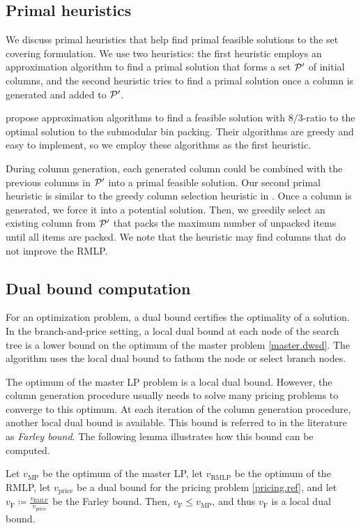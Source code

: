 \subsection{Primal heuristics}
\label{sec.pheur}
We discuss primal heuristics that help find primal feasible solutions to the set covering formulation. We use two heuristics: the first heuristic employs an approximation algorithm to find a primal solution that forms a set $\mathcal P'$ of initial columns, and the second heuristic tries to find a primal solution once a column is generated and added to $\mathcal P'$.

 \cite{cohen2019overcommitment} propose approximation algorithms to find a feasible solution with $8/3$-ratio to the optimal solution to the submodular bin packing. Their algorithms are greedy and easy to implement, so we employ these algorithms as the first heuristic.


During column generation, each generated column could be combined with the previous columns in $\mathcal P'$ into a  primal feasible solution. Our second primal  heuristic is similar to the greedy column selection heuristic in \cite{lubbecke2012primal,joncour2010column}.  Once a column is generated, we force it into a potential solution. Then, we greedily select an existing column from $\mathcal P'$ that packs the maximum number of unpacked items until all items are packed.  We note that the heuristic may find columns that do not improve the RMLP.




\subsection{Dual bound computation}

For an optimization problem, a dual bound certifies the optimality of a solution. In the branch-and-price setting, a local dual bound at each node of the search tree is a lower bound on the optimum of the master problem \eqref{master.dwsd}. The algorithm uses the local dual bound to fathom the node or select branch nodes.

The optimum of the master LP problem is a local dual bound. However, the column generation procedure usually needs to solve many pricing problems to converge to this optimum. At each iteration of the column generation procedure, another local dual bound is available. This bound is referred to in the literature as \textit{Farley bound}. The following lemma illustrates how this bound can be computed.

\begin{lemma}

\label{lem.valildlbd}

Let \(v_{\mathrm{MP}}\) be the optimum of the master LP, let \(v_{\mathrm{RMLP}}\) be the optimum of the RMLP, let \(v_{\mathrm{price}}\) be a dual bound for the pricing problem \eqref{pricing.ref}, and let \(v_{\mathrm{F}} \coloneqq \frac{v_{\mathrm{RMLP}}}{v_{\mathrm{price}}}\) be the Farley bound. Then, $ v_{\mathrm{F}} \le v_{\mathrm{MP}}$, and thus $v_{\mathrm{F}}$ is a local dual bound.

\end{lemma}

